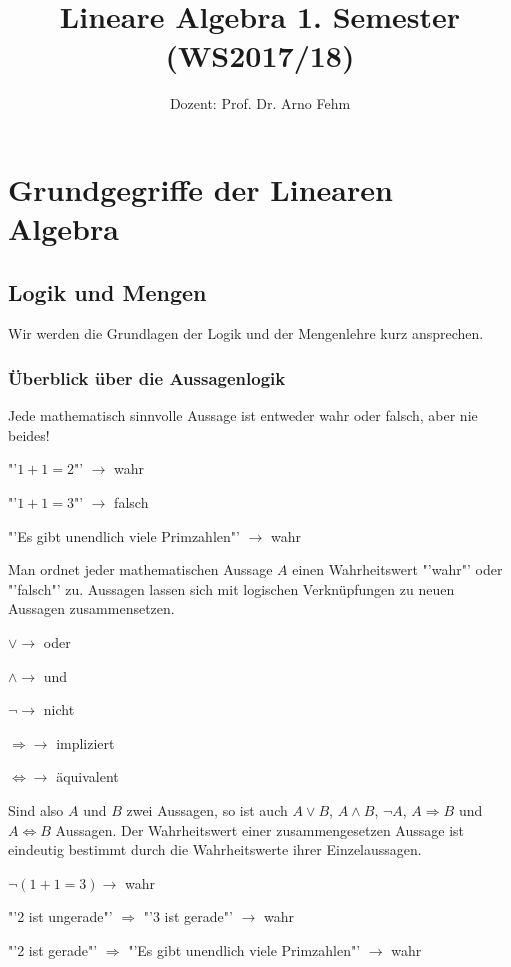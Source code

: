 \documentclass[11pt]{article}
\title{\textbf{Lineare Algebra 1. Semester (WS2017/18)}}
\author{Dozent: Prof. Dr. Arno Fehm}
\date{}
\begin{document}
\maketitle
\renewcommand*{\arraystretch}{1.4}

\raggedright 
\section{Grundgegriffe der Linearen Algebra}
	\subsection{Logik und Mengen}
		Wir werden die Grundlagen der Logik und der Mengenlehre kurz ansprechen.
		\subsubsection{\"Uberblick \"uber die Aussagenlogik}
			Jede mathematisch sinnvolle Aussage ist entweder wahr oder falsch, aber nie beides!
			\begin{compactitem}
				\item "'$1+1=2$"' $\to$ wahr
				\item "'$1+1=3$"' $\to$ falsch
				\item "'Es gibt unendlich viele Primzahlen"' $\to$ wahr
			\end{compactitem}
			Man ordnet jeder mathematischen Aussage $A$ einen Wahrheitswert "'wahr"' oder "'falsch"' zu. Aussagen
			lassen sich mit logischen Verkn\"upfungen zu neuen Aussagen zusammensetzen.
			\begin{compactitem}
				\item $\lor \to$ oder
				\item $\land \to$ und
				\item $\lnot \to$ nicht
				\item $\Rightarrow \to$ impliziert
				\item $\iff \to$ \"aquivalent
			\end{compactitem}
			Sind also $A$ und $B$ zwei Aussagen, so ist auch $A \lor B$, $A \land B$, $\lnot A$, 
			$A \Rightarrow B$ und $A \iff B$ Aussagen. Der Wahrheitswert einer zusammengesetzen Aussage ist
			eindeutig bestimmt durch die Wahrheitswerte ihrer Einzelaussagen.
			\begin{compactitem}
				\item $\lnot (1+1=3) \to$ wahr
				\item "'2 ist ungerade"' $\Rightarrow$ "'3 ist gerade"' $\to$ wahr
				\item "'2 ist gerade"' $\Rightarrow$ "'Es gibt unendlich viele Primzahlen"' $\to$ wahr
			\end{compactitem}
\end{document}
